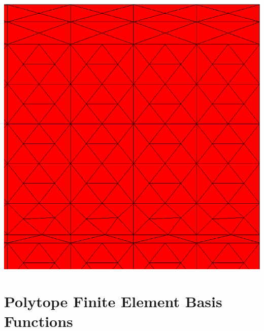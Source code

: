 \documentclass[compress,10pt]{beamer}
\begin{document}
\begin{frame}[t]
{{}\includegraphics[width=0.345\columnwidth]{images/IM1_zoom.eps}
}
\end{frame}
%
%
\section[POLYFEM]{Polytope Finite Element Basis Functions}
\end{document}
